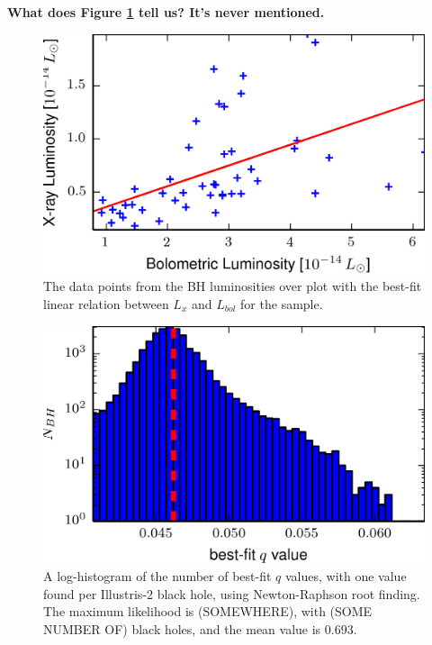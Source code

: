 \textbf{What does Figure \ref{fig:Elvis_template} tell us? It's never
mentioned.}
\begin{figure}
\centering{}\includegraphics[clip]{Figures/elvis_template} \protect\caption{\label{fig:Elvis_template}The data points from the BH luminosities
over plot with the best-fit linear relation between $L_{x}$ and $L_{bol}$
for the sample.}
\end{figure}
\begin{figure}
\begin{centering}
\includegraphics{Figures/q_nr_hist}
\par\end{centering}

\protect\caption{\label{fig:q_nr_hist}A log-histogram of the number of best-fit $q$
values, with one value found per Illustris-2 black hole, using Newton-Raphson
root finding. The maximum likelihood is (SOMEWHERE), with (SOME NUMBER
OF) black holes, and the mean value is $0.693$.}
\end{figure}
